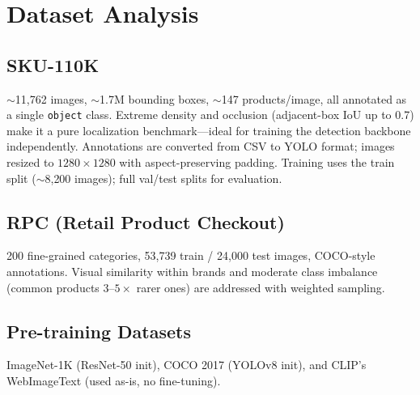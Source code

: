\section{Dataset Analysis}
\subsection{SKU-110K}
$\sim$11{,}762 images, $\sim$1.7M bounding boxes, $\sim$147 products/image, all annotated as a
single \texttt{object} class. Extreme density and occlusion (adjacent-box IoU up to 0.7) make it a
pure localization benchmark---ideal for training the detection backbone independently. Annotations
are converted from CSV to YOLO format; images resized to $1280\times1280$ with aspect-preserving
padding. Training uses the train split ($\sim$8{,}200 images); full val/test splits for evaluation.

\subsection{RPC (Retail Product Checkout)}
200 fine-grained categories, 53{,}739 train / 24{,}000 test images, COCO-style annotations. Visual
similarity within brands and moderate class imbalance (common products $3$--$5\times$ rarer ones)
are addressed with weighted sampling.

\subsection{Pre-training Datasets}
ImageNet-1K (ResNet-50 init), COCO 2017 (YOLOv8 init), and CLIP's WebImageText (used as-is, no
fine-tuning).
